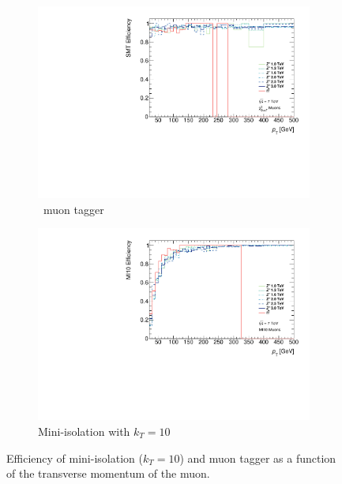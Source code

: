 \begin{figure}
\begin{subfigure}{\linewidth} \centering
\includegraphics[width=\textwidth]{PartBoosted/Plots/he_staco_smt_pt.pdf}
\caption{\xsm\ muon tagger} \label{fig:BoostedSMTeffVsPt}
\end{subfigure}

\begin{subfigure}{\linewidth} \centering
\includegraphics[width=\textwidth]{PartBoosted/Plots/he_muid_mi10_pt.pdf}
\caption{Mini-isolation with $k_{T}=10$} \label{fig:BoostedMIeffVsPt}
\end{subfigure}
\caption{Efficiency of mini-isolation ($k_{T}=10$) and \xsm muon tagger as a function of the transverse momentum of the muon.} \label{fig:BoostedEfficiencyVsPt}
\end{figure}

